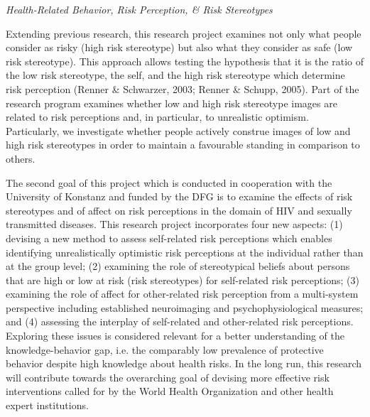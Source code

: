 {\textit{Health-Related Behavior, Risk Perception, \& Risk Stereotypes}

 Extending previous research, this research project examines not only what people consider as risky (high risk stereotype) but also what they consider as safe (low risk stereotype). This approach allows testing the hypothesis that it is the ratio of the low risk stereotype, the self, and the high risk stereotype which determine risk perception (Renner \& Schwarzer, 2003; Renner \& Schupp, 2005). Part of the research program examines whether low and high risk stereotype images are related to risk perceptions and, in particular, to unrealistic optimism. Particularly, we investigate whether people actively construe images of low and high risk stereotypes in order to maintain a favourable standing in comparison to others.

 The second goal of this project which is conducted in cooperation with the University of Konstanz and funded by the DFG is to examine the effects of risk stereotypes and of affect on risk perceptions in the domain of HIV and sexually transmitted diseases. This research project incorporates four new aspects: (1) devising a new method to assess self-related risk perceptions which enables identifying unrealistically optimistic risk perceptions at the individual rather than at the group level; (2) examining the role of stereotypical beliefs about persons that are high or low at risk (risk stereotypes) for self-related risk perceptions; (3) examining the role of affect for other-related risk perception from a multi-system perspective including established neuroimaging and psychophysiological measures; and (4) assessing the interplay of self-related and other-related risk perceptions. Exploring these issues is considered relevant for a better understanding of the knowledge-behavior gap, i.e. the comparably low prevalence of protective behavior despite high knowledge about health risks. In the long run, this research will contribute towards the overarching goal of devising more effective risk interventions called for by the World Health Organization and other health expert institutions.


}
